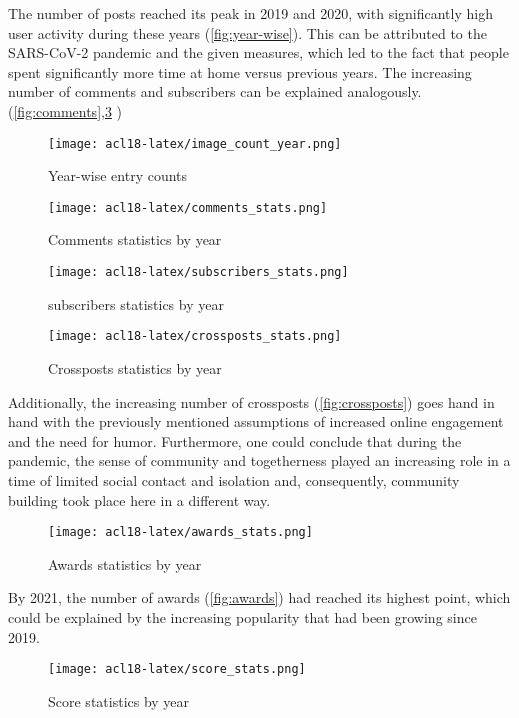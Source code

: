 \documentclass[11pt,a4paper]{article}
\begin{document}
 
 The number of posts reached its peak in 2019 and 2020, with significantly high user activity during these years (\autoref{fig:year-wise}). This can be attributed to the SARS-CoV-2 pandemic and the given measures, which led to the fact that people spent significantly more time at home versus previous years. The increasing number of comments and subscribers can be explained analogously.(\autoref{fig:comments},\ref{fig:subscribers} ) 
 \begin{figure}[H]
    \centering
    \texttt{[image: acl18-latex/image\_count\_year.png]}
    \caption{Year-wise entry counts}
    \label{fig:year-wise}
\end{figure}
\begin{figure}[H]
    \centering
    \texttt{[image: acl18-latex/comments\_stats.png]}
    \caption{Comments statistics by year}
    \label{fig:comments}
\end{figure}
\begin{figure}[H]
    \centering
    \texttt{[image: acl18-latex/subscribers\_stats.png]}
    \caption{subscribers statistics by year}
    \label{fig:subscribers}
\end{figure}
\vspace{-4cm}
\begin{figure}[H]
    \centering
    \texttt{[image: acl18-latex/crossposts\_stats.png]}
    \caption{Crossposts statistics by year}
    \label{fig:crossposts}
\end{figure}
Additionally, the increasing number of crossposts (\autoref{fig:crossposts}) goes hand in hand with the previously mentioned assumptions of increased online engagement and the need for humor. Furthermore, one could conclude that during the pandemic, the sense of community and togetherness played an increasing role in a time of limited social contact and isolation and, consequently, community building took place here in a different way. 
\begin{figure}[H]
    \centering
    \texttt{[image: acl18-latex/awards\_stats.png]}
    \caption{Awards statistics by year}
    \label{fig:awards}
\end{figure}
By 2021, the number of awards (\autoref{fig:awards}) had reached its highest point, which could be explained by the increasing popularity that had been growing since 2019.
\begin{figure}[H]
    \centering
    \texttt{[image: acl18-latex/score\_stats.png]}
    \caption{Score statistics by year}
    \label{fig:score}
\end{figure}
\end{document}
